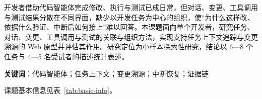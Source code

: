 %
%
%

\makeatletter
\renewcommand{\theHtable}{\thetable}
\renewcommand{\theHfigure}{\thefigure}
\makeatother

\iftjproposalabstract
{}

开发者借助代码智能体完成修改、执行与测试已成日常，但对话、变更、工具调用与测试结果分散在不同界面，缺少以开发任务为中心的组织，使“为什么这样改、依据什么验证、中断后如何接上”难以回答。本课题面向单个开发者，研究任务、对话、变更、工具调用与测试的关联与组织方法，实现支持任务上下文追踪与变更溯源的 Web 原型并评估其作用。研究定位为小样本探索性研究，结论以 6—8 个任务与 4—5 名受试者的描述统计表述。

\textbf{关键词}：代码智能体；任务上下文；变更溯源；中断恢复；证据链
\fi



课题基本信息见表~\ref{tab:basic-info}。

